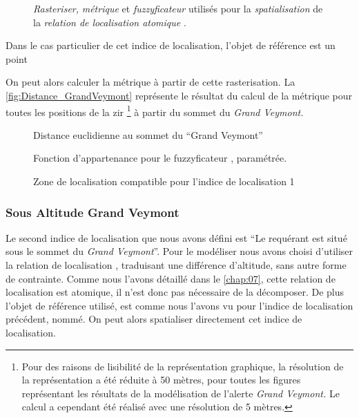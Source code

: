 \begin{figure}
  \centering
  
  \caption{\emph{Rasteriser,} \emph{métrique} et \emph{fuzzyficateur}
    utilisés pour la \emph{spatialisation} de la \emph{relation de
      localisation atomique}
    \protect{}.}
  \label{fig:ex_parties_statialisation_horsdeplani}
\end{figure}

Dans le cas particulier de cet indice de localisation, l'objet de
référence est un point


On peut alors calculer la métrique à partir de cette rasterisation. La
\autoref{fig:Distance_GrandVeymont} représente le résultat du calcul
de la métrique  pour toutes les positions de la
\ac{zir} \footnote{Pour des raisons de lisibilité de la représentation
  graphique, la résolution de la représentation a été réduite à 50
  mètres, pour toutes les figures représentant les résultats de la
  modélisation de l'alerte \emph{Grand Veymont.} Le calcul a cependant
  été réalisé avec une résolution de 5 mètres.} à partir du sommet du
\emph{Grand Veymont.}

\begin{figure}
  \centering
  
  \caption{Distance euclidienne au sommet du \enquote{Grand Veymont}}
  \label{fig:Distance_GrandVeymont}
\end{figure}


\begin{figure}
  \centering
  
  \caption{Fonction d'appartenance pour le fuzzyficateur
    \protect{}, paramétrée.}
  \label{fig:fuzzy_veyont_distanceSommet}
\end{figure}


\begin{figure}
  \centering
  
  \caption{Zone de localisation compatible pour l'indice de
    localisation 1}
  \label{fig:ZLC_GrandVeymont_1}
\end{figure}

\subsubsection{Sous Altitude Grand Veymont}

Le second indice de localisation que nous avons défini est \enquote{Le
  requérant est situé sous le sommet du \emph{Grand Veymont}}. Pour le
modéliser nous avons choisi d'utiliser la relation de localisation
, traduisant une différence d'altitude, sans
autre forme de contrainte. Comme nous l'avons détaillé dans le
\autoref{chap:07}, cette relation de localisation est atomique, il
n'est donc pas nécessaire de la décomposer. De plus l'objet de
référence utilisé, est comme nous l'avons vu pour l'indice de
localisation précédent, nommé. On peut alors spatialiser directement
cet indice de localisation.

